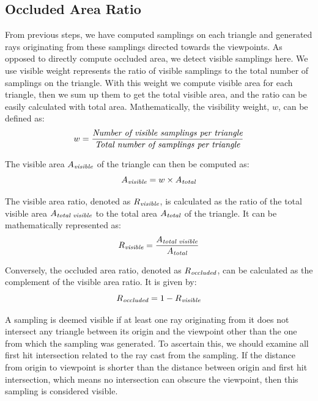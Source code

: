 \documentclass[11pt, a4paper,oneside,chapterprefix=false]{scrbook}
\begin{document}
\subsection{Occluded Area Ratio}

From previous steps, we have computed samplings on each triangle and generated rays originating from these samplings directed towards the viewpoints. As opposed to directly compute occluded area, we detect visible samplings here. We use visible weight represents the ratio of visible samplings to the total number of samplings on the triangle. With this weight we compute visible area for each triangle, then we sum up them to get the total visible area, and the ratio can be easily calculated with total area. Mathematically, the visibility weight, \( w \), can be defined as:
\[ 
    w = \frac{\emph{Number of visible samplings per triangle}}{\emph{Total number of samplings per triangle}}
\]

The visible area \( A_{\emph{visible}} \) of the triangle can then be computed as:
\[ 
    A_{\emph{visible}} = w \times A_{\emph{total}}
\]

The visible area ratio, denoted as \( R_{\emph{visible}} \), is calculated as the ratio of the total visible area \( A_{\emph{total visible}} \) to the total area \( A_{\emph{total}} \) of the triangle. It can be mathematically represented as:
\[ 
    R_{\emph{visible}} = \frac{A_{\emph{total visible}}}{A_{\emph{total}}}
\]

Conversely, the occluded area ratio, denoted as \( R_{\emph{occluded}} \), can be calculated as the complement of the visible area ratio. It is given by:
\[ 
    R_{\emph{occluded}} = 1 - R_{\emph{visible}}
\]

A sampling is deemed visible if at least one ray originating from it does not intersect any triangle between its origin and the viewpoint other than the one from which the sampling was generated. To ascertain this, we should examine all first hit intersection related to the ray cast from the sampling. If the distance from origin to viewpoint is shorter than the distance between origin and first hit intersection, which means no intersection can obscure the viewpoint, then this sampling is considered visible. 
\end{document}
